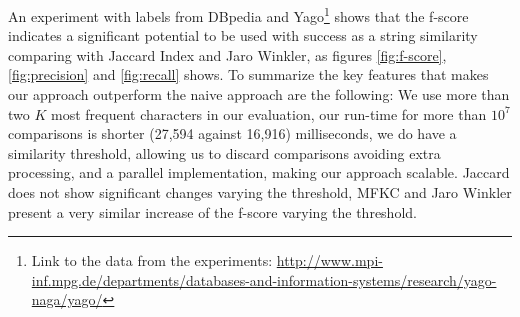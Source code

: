 An experiment with labels from DBpedia and Yago\footnote{Link to the data from the experiments: \url{http://www.mpi-inf.mpg.de/departments/databases-and-information-systems/research/yago-naga/yago/}} shows that the f-score indicates a significant potential to be used with success as a string similarity comparing with Jaccard Index and Jaro Winkler, as figures \ref{fig:f-score}, \ref{fig:precision} and \ref{fig:recall} shows.
To summarize the key features that makes our approach outperform the naive approach are the following: We use more than two $K$ most frequent characters in our evaluation, our run-time for more than $10^7$ comparisons is shorter (27,594 against 16,916) milliseconds, we do have a similarity threshold, allowing us to discard comparisons avoiding extra processing, and a parallel implementation, making our approach scalable.
Jaccard does not show significant changes varying the threshold, MFKC and Jaro Winkler present a very similar increase of the f-score varying the threshold.



